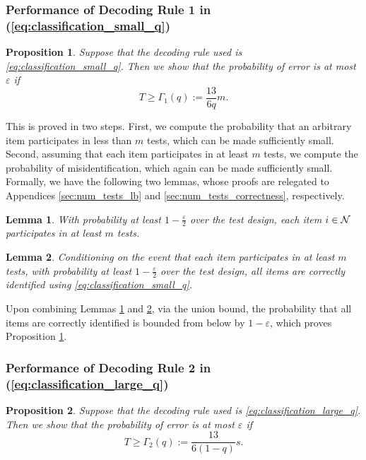 \documentclass[onecolumn,letterpaper]{IEEEtran}
\newtheorem{lemma}{Lemma}
\newtheorem{proposition}{Proposition}
\newcommand{\nT}{{T}}
\newcommand{\cp}{{q}}
\newcommand{\nt}{{m}}
\newcommand{\mo}{{s}}
\newcommand{\ftau}{{\Gamma}}
\newcommand{\fTo}{\ftau_1(\cp)}
\newcommand{\fTt}{\ftau_2(\cp)}
\begin{document}
\subsubsection{Performance of Decoding Rule 1 in (\ref{eq:classification_small_q})} \label{sec:prop1}
\begin{proposition} 
\label{prop:error_small_q}
Suppose that the decoding rule used is \eqref{eq:classification_small_q}. Then we show that the probability of error is at most $ \varepsilon$ 
if 
\begin{equation} 
\label{eq:T_small_q}
\nT \ge \fTo := \frac{13}{6\cp} \nt.
\end{equation}
\end{proposition}

This is proved in two steps. 
First, we compute the probability that an arbitrary item participates in less than $\nt$ tests, which can be made sufficiently small. Second, assuming that each item participates in at least $\nt$ tests, we compute the probability of misidentification, which again can be made sufficiently small. Formally, we have the following two lemmas, whose proofs are relegated to Appendices \ref{sec:num_tests_lb} and \ref{sec:num_tests_correctness}, respectively.
\begin{lemma} 
\label{lem:num_tests_lb}
With probability at least $1-\frac{\varepsilon}{2}$ over the test design, each item $i \in {\cal N}$ participates in at least $\nt$ tests.
\end{lemma}
\begin{lemma}
\label{lem:num_tests_correctness}
Conditioning on the event that each item participates in at least $\nt$ tests, with probability at least $1-\frac \varepsilon 2$ over the test design, all items are correctly identified using \eqref{eq:classification_small_q}.
\end{lemma}

Upon combining Lemmas \ref{lem:num_tests_lb} and \ref{lem:num_tests_correctness}, via the union bound, the probability that all items are correctly identified is bounded from below by  $1 - \varepsilon$,
which proves Proposition \ref{prop:error_small_q}.



\subsubsection{Performance of Decoding Rule 2 in (\ref{eq:classification_large_q})} \label{sec:prop2}
\begin{proposition} \label{prop:error_large_q}
Suppose that the decoding rule used is \eqref{eq:classification_large_q}. Then we show that the probability of error is at most $ \varepsilon$ 
if 
\begin{equation} 
\label{eq:T_large_q}
T \ge \fTt := \frac{13}{6(1-\cp)} \mo . 
\end{equation}
\end{proposition}
\end{document}
